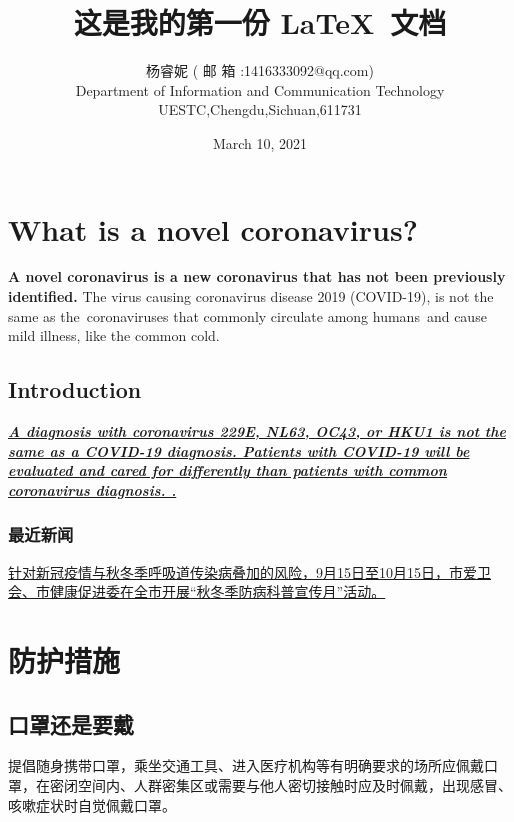 \documentclass[11pt]{article}
\title{这是我的第一份 \LaTeX\ 文档}
\author{ 杨睿妮 ( 邮 箱 :1416333092@qq.com)\\ Department of Information and Communication
Technology\\UESTC,Chengdu,Sichuan,611731}
\date{March 10, 2021}
\begin{document}
\begin{sloppypar}
\maketitle
\section{What is a novel coronavirus?}   
\begin{flushright}
    \textbf{A novel coronavirus is a new coronavirus that has not been previously identified.} \newline
    The virus causing coronavirus disease 2019 (COVID-19), is not the same as the coronaviruses that commonly circulate among humans and cause mild illness, like the common cold.

\end{flushright}   
\subsection{Introduction}
\textbf{\emph{\ul{A diagnosis with coronavirus 229E, NL63, OC43, or HKU1 is not the same as a COVID-19 diagnosis. Patients with COVID-19 will be evaluated and cared for differently than patients with common coronavirus diagnosis.
.}}}
    \subsubsection{最近新闻}
    \begin{center}
    \uline{针对新冠疫情与秋冬季呼吸道传染病叠加的风险，9月15日至10月15日，市爱卫会、市健康促进委在全市开展“秋冬季防病科普宣传月”活动。}\\
    \end{center}
    \newpage
\section{防护措施} 
\subsection{口罩还是要戴}
\begin{center}
    提倡随身携带口罩，乘坐交通工具、进入医疗机构等有明确要求的场所应佩戴口罩，在密闭空间内、人群密集区或需要与他人密切接触时应及时佩戴，出现感冒、咳嗽症状时自觉佩戴口罩。
\end{center}
    

\end{sloppypar}
\end{document}
